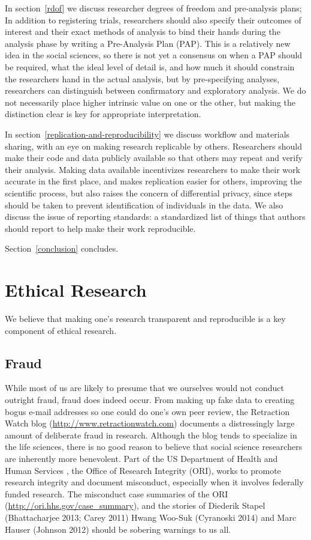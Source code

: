 \documentclass[12pt] {article}
\begin{document}
In section~\ref{rdof} we discuss researcher degrees of freedom and pre-analysis
plans; In addition to registering trials, researchers should also
specify their outcomes of interest and their exact methods of analysis
to bind their hands during the analysis phase by writing a Pre-Analysis
Plan (PAP). This is a relatively new idea in the social sciences, so
there is not yet a consensus on when a PAP should be required, what the
ideal level of detail is, and how much it should constrain the
researchers hand in the actual analysis, but by pre-specifying analyses,
researchers can distinguish between confirmatory and exploratory
analysis. We do not necessarily place higher intrinsic value on one or
the other, but making the distinction clear is key for appropriate
interpretation.

In section~\ref{replication-and-reproducibility} we discuss workflow and materials sharing, with an eye on
making research replicable by others. Researchers should make their code
and data publicly available so that others may repeat and verify their
analysis. Making data available incentivizes researchers to make their
work accurate in the first place, and makes replication easier for
others, improving the scientific process, but also raises the concern of
differential privacy, since steps should be taken to prevent
identification of individuals in the data. We also discuss the issue of
reporting standards: a standardized list of things that authors should
report to help make their work reproducible.

Section~\ref{conclusion} concludes.

\section{Ethical Research}\label{ethical-research}

We believe that making one's research transparent and reproducible is a
key component of ethical research.

\subsection{Fraud}\label{fraud}

While most of us are likely to presume that we ourselves would not
conduct outright fraud, fraud does indeed occur. From making up fake
data to creating bogus e-mail addresses so one could do one's own peer
review, the Retraction Watch blog (\url{http://www.retractionwatch.com})
documents a distressingly large amount of deliberate fraud in research.
Although the blog tends to specialize in the life sciences, there is no
good reason to believe that social science researchers are inherently
more benevolent. Part of the US Department of Health and Human Services
, the Office of Research Integrity (ORI), works to promote research
integrity and document misconduct, especially when it involves federally
funded research. The misconduct case summaries of the ORI
(\url{http://ori.hhs.gov/case_summary}), and the stories of Diederik
Stapel (Bhattacharjee 2013; Carey 2011) Hwang Woo-Suk (Cyranoski 2014)
and Marc Hauser (Johnson 2012) should be sobering warnings to us all.
\end{document}
